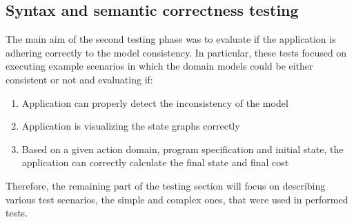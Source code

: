 \documentclass[a4paper]{article}
\begin{document}
\subsection{Syntax and semantic correctness testing}
%
The main aim of the second testing phase was to evaluate if the application is adhering correctly to the model consistency. In particular, these tests focused on executing example scenarios in which the domain models could be either consistent or not and evaluating if:
\begin{enumerate}
    \item Application can properly detect the inconsistency of the model
    \item Application is visualizing the state graphs correctly
    \item Based on a given action domain, program specification and initial state, the application can correctly calculate the final state and final cost
\end{enumerate}

Therefore, the remaining part of the testing section will focus on describing various test scenarios, the simple and complex ones, that were used in performed tests.
\end{document}

